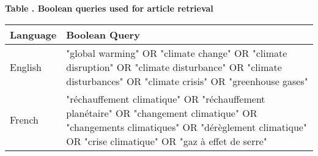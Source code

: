 \documentclass[12pt]{article}
\begin{document}
\begin{center}
\begingroup
{}\label{tab:boolean_queries}
\begin{minipage}{0.95\linewidth}
\centering
\setlength{\tabcolsep}{8pt}
\renewcommand{\arraystretch}{1.25}
\textbf{Table \thetable. Boolean queries used for article retrieval}
\vspace{0.5em}

{\fontsize{10}{12}\selectfont
\begin{tabular}{>{\raggedright\arraybackslash}p{2.8cm} >{\raggedright\arraybackslash}p{12cm}}
\toprule
\textbf{Language} & \textbf{Boolean Query} \\
\midrule
English & "global warming" OR "climate change" OR "climate disruption" OR "climate disturbance" OR "climate disturbances" OR "climate crisis" OR "greenhouse gases" \\
French & "réchauffement climatique" OR "réchauffement planétaire" OR "changement climatique" OR "changements climatiques" OR "dérèglement climatique" OR "crise climatique" OR "gaz à effet de serre" \\
\bottomrule
\end{tabular}
}
\end{minipage}
\endgroup
\end{center}
\end{document}
